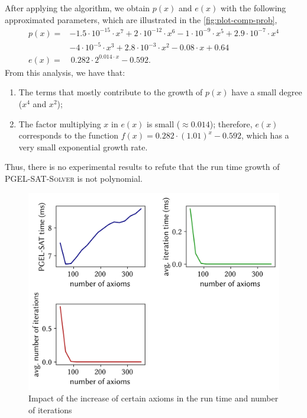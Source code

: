 After applying the algorithm, we obtain $p(x)$ and $e(x)$ with the following approximated parameters, which are illustrated in the \cref{fig:plot-comp-prob},
\begin{align*}
  p(x) =& -1.5  \cdot  10^{-15} \cdot x^7 
        + 2 \cdot 10^{-12} \cdot x^6 
        - 1 \cdot 10^{-9} \cdot x^5 
        + 2.9 \cdot 10^{-7} \cdot x^4\\ 
        &- 4 \cdot 10^{-5} \cdot x^3 
        + 2.8  \cdot  10^{-3}\cdot x^2 
        - 0.08 \cdot x 
        + 0.64\\
  e(x) =& \, 0.282 \cdot 2^{0.014 \cdot x} - 0.592.
\end{align*}
From this analysis, we have that:
\begin{enumerate}[label=(\alph*)]
  \item The terms that mostly contribute to the growth of $p(x)$ have a small degree ($x^4$ and $x^2$);
  \item The factor multiplying $x$ in $e(x)$ is small ($\approx 0.014$); therefore, $e(x)$ corresponds to the function $f(x) = 0.282 \cdot (1.01)^{x} - 0.592$, which has a very small exponential growth rate.
\end{enumerate}
Thus, there is no experimental results to refute that the run time growth of \textsc{PGEL-SAT-Solver} is not polynomial. 

\begin{figure}[ht]
  \centering
  \includegraphics[width=.75\textwidth]{../img/plot-comp1-0}
  \caption{Impact of the increase of certain axioms in the run time and number of iterations}
  \label{fig:plot-comp-1}
\end{figure}

